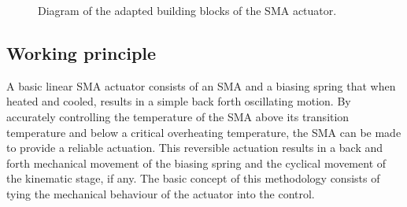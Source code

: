 \begin{figure}[h] %
  \centering
  \caption{Diagram of the adapted building blocks of the SMA actuator.}
  \label{fig:building-blocks-ct}
\end{figure}

\subsection{Working principle}

A basic linear SMA actuator consists of an SMA and a biasing spring that when heated and cooled, results in a simple back forth oscillating motion. By accurately controlling the temperature of the SMA above its transition temperature and below a critical overheating temperature, the SMA can be made to provide a reliable actuation. This reversible actuation results in a back and forth mechanical movement of the biasing spring and the cyclical movement of the kinematic stage, if any. The basic concept of this methodology consists of tying the mechanical behaviour of the actuator into the control.

